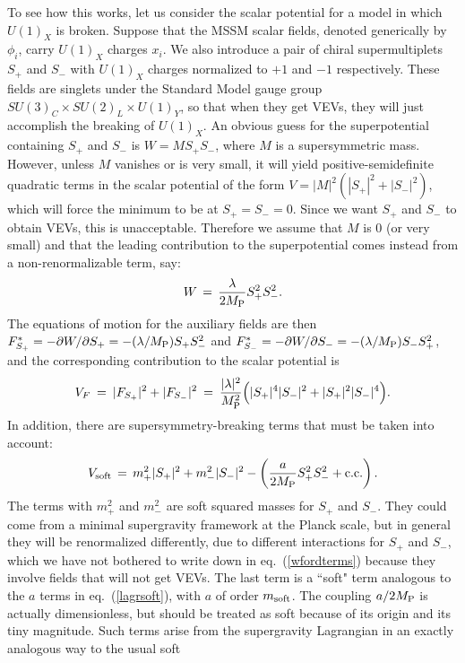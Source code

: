 \documentclass[11pt]{article}
\def\beq{\begin{eqnarray}}
\def\eeq{\end{eqnarray}}
\def\conj{{{\rm c.c.}}}
\def\MPlanck{M_{\rm P}}
\def\Splus{S_+}
\def\Sminus{S_-}
\begin{document}
To see how this works, let us consider the scalar potential for a model in
which $U(1)_X$ is broken. Suppose that the MSSM scalar fields, denoted
generically by $\phi_i$, carry $U(1)_X$ charges $x_i$. We also introduce a
pair of chiral supermultiplets $\Splus$ and $\Sminus$ with $U(1)_X$
charges normalized to $+1$ and $-1$ respectively. These fields are
singlets under the Standard Model gauge group $SU(3)_C \times SU(2)_L
\times U(1)_Y$, so that when they get VEVs, they will just accomplish the
breaking of $U(1)_X$. An obvious guess for the superpotential containing
$\Splus$ and $\Sminus$ is $W = M \Splus \Sminus$, where $M$ is a
supersymmetric mass. However, unless $M$ vanishes or is very small, it
will yield positive-semidefinite quadratic terms in the scalar potential
of the form $V = |M|^2 (|\Splus|^2 + |\Sminus|^2)$, which will force the
minimum to be at $\Splus = \Sminus = 0$. Since we want $\Splus$ and
$\Sminus$ to obtain VEVs, this is unacceptable. Therefore we assume that
$M$ is 0 (or very small) and that the leading contribution to the
superpotential comes instead from a non-renormalizable term, say: 
\beq
W \,=\, {\lambda\over 2 \MPlanck} \Splus^2 \Sminus^2.
\label{wfordterms}
\eeq
The equations 
of motion for the auxiliary fields are then $F^*_{\Splus} = -\partial 
W/\partial \Splus = -(\lambda/\MPlanck)\Splus \Sminus^{2}$ and 
$F^*_{\Sminus} = -\partial W/\partial \Sminus = -(\lambda/\MPlanck)\Sminus 
\Splus^{2}$, and the corresponding contribution to the scalar potential is
\beq
V_F \>=\> |F_{\Splus}|^2 + |F_{\Sminus}|^2  \>=\>
{|\lambda|^2\over \MPlanck^2}
\Bigl ( |\Splus|^4 |\Sminus|^2 + |\Splus|^2 |\Sminus|^4 \Bigr )  .
\eeq
In addition, there are supersymmetry-breaking terms that must be taken 
into account:
\beq
V_{\rm soft} \,=\, m_+^2 |\Splus|^2 + m_-^2 |\Sminus|^2 -
\left ({a\over 2\MPlanck} \Splus^2 \Sminus^2 + \conj\right ).
\eeq
The terms with $m_+^2$ and $m_-^2$ are soft squared masses for
$\Splus$ and $\Sminus$. They could come from a minimal supergravity
framework at the Planck scale, but in general they will be renormalized
differently, due to different interactions for $\Splus$ and $\Sminus$,
which we have not bothered to write down in eq.~(\ref{wfordterms}) because
they involve fields that will not get VEVs. The last term is a ``soft" 
term analogous to the $a$ terms in 
eq.~(\ref{lagrsoft}), with $a$ of order $m_{\rm soft}$. The coupling
$a/2\MPlanck$ is actually dimensionless, but should be treated as soft
because of its origin and its tiny magnitude. Such terms arise from the
supergravity Lagrangian in an exactly analogous way to the usual soft
\end{document}
